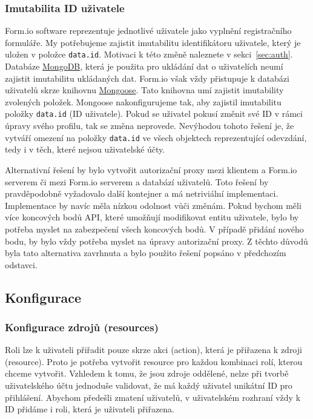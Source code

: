 \subsubsection{Imutabilita ID uživatele}\label{subsubsec:imutabilita-id-uzivatele}

Form.io software reprezentuje jednotlivé uživatele jako vyplnění registračního formuláře.
My potřebujeme zajistit imutabilitu identifikátoru uživatele, který je uložen v položce \texttt{data.id}.
Motivaci k této změně naleznete v sekci~\ref{sec:auth}.
Databáze \href{https://www.mongodb.com/}{MongoDB}, která je použita pro ukládání dat o uživatelích neumí zajistit imutabilitu ukládaných dat.
Form.io však vždy přistupuje k databázi uživatelů skrze knihovnu \href{https://mongoosejs.com/}{Mongoose}.
Tato knihovna umí zajistit imutability zvolených položek.
Mongoose nakonfigurujeme tak, aby zajistil imutabilitu položky \texttt{data.id} (ID uživatele).
Pokud se uživatel pokusí změnit své ID v rámci úpravy svého profilu, tak se změna neprovede.
Nevýhodou tohoto řešení je, že vytváří omezení na položky \texttt{data.id} ve všech objektech reprezentující odevzdání, tedy i v těch, které nejsou uživatelské účty.

Alternativní řešení by bylo vytvořit autorizační proxy mezi klientem a Form.io serverem či mezi Form.io serverem a databází uživatelů.
Toto řešení by pravděpodobně vyžadovalo další kontejner a má netriviální implementaci.
Implementace by navíc měla nízkou odolnost vůči změnám.
Pokud bychom měli více koncových bodů API, které umožňují modifikovat entitu uživatele, bylo by potřeba myslet na zabezpečení všech koncových bodů.
V případě přidání nového bodu, by bylo vždy potřeba myslet na úpravy autorizační proxy.
Z těchto důvodů byla tato alternativa zavrhnuta a bylo použito řešení popsáno v předchozím odstavci.

\subsection{Konfigurace}\label{subsec:konfigurace}

\subsubsection{Konfigurace zdrojů (resources)}\label{subsubsec:konfigurace-resources}

Roli lze k uživateli přiřadit pouze skrze akci (action), která je přiřazena k zdroji (resource).
Proto je potřeba vytvořit resource pro každou kombinaci rolí, kterou chceme vytvořit.
Vzhledem k tomu, že jsou zdroje oddělené, nelze při tvorbě uživatelského účtu jednoduše validovat, že má každý uživatel unikátní ID pro přihlášení.
Abychom předešli zmatení uživatelů, v uživatelském rozhraní vždy k ID přidáme i roli, která je uživateli přiřazena.

